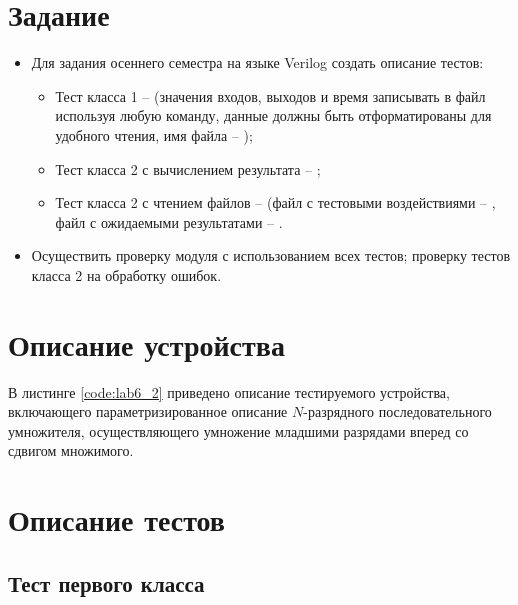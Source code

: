 





\tableofcontents
\lstlistoflistings
\listoffigures
\newpage

\section{Задание}

\begin{itemize}
	\item Для задания  осеннего семестра на языке Verilog создать описание тестов:
		\begin{itemize}
			\item Тест класса 1 --  (значения входов, выходов и время записывать в файл используя любую команду, данные должны быть отформатированы для удобного чтения, имя файла -- );
			\item Тест класса 2 с вычислением результата -- ;
			\item Тест класса 2 с чтением файлов --  (файл с тестовыми воздействиями -- , файл с ожидаемыми результатами -- .
		\end{itemize}

	\item Осуществить проверку модуля с использованием всех тестов; проверку тестов класса 2 на обработку ошибок.
\end{itemize}

\section{Описание устройства}

В листинге \ref{code:lab6_2} приведено описание тестируемого устройства, включающего параметризированное описание $N$-разрядного последовательного умножителя, осуществляющего умножение младшими разрядами вперед со сдвигом множимого.


\section{Описание тестов}
\label{sec:tests}

\subsection{Тест первого класса}

